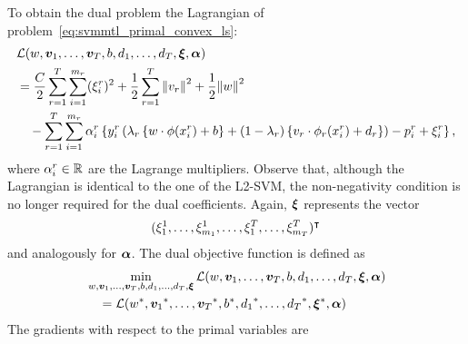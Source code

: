  To obtain the dual problem the Lagrangian of problem~\eqref{eq:svmmtl_primal_convex_ls}:
\begin{equation}\label{eq:svmmtl_lagrangian_convex_ls}
    \begin{aligned}
        & \lagr({w}, \fv{v}_1, \ldots, \fv{v}_\ntasks, b, d_1, \ldots, d_\ntasks, \fv{\xi}, \fv{\alpha}) \\
        &=  \frac{C}{2} \sum_{r= 1}^T \sum_{i=1}^{m_r} ({\xi_{i}^r})^2 + \frac{1}{2} \sum_{r= 1}^T{\norm{{v}_r}^2} + \frac{1}{2} {\norm{{w}}}^2 \\
        &\quad -  \sum_{r= 1}^T \sum_{i=1}^{m_r} \alpha_i^r \left\lbrace y_{i}^r  \left(\lambda_r \left\lbrace {w} \cdot \phi(x_{i}^r) + b  \right\rbrace + (1 - \lambda_r) \left\lbrace {v}_r \cdot \phi_r(x_{i}^r) + d_r \right\rbrace  \right) - p_{i}^r + \xi_{i}^r  \right\rbrace ,
    \end{aligned}
\end{equation}
where $\alpha_i^r \in \mathbb{R}$ are the Lagrange multipliers. Observe that, although the Lagrangian is identical to the one of the L2-SVM, the non-negativity condition is no longer required for the dual coefficients.  Again, $\bm{\xi}$ represents the vector $$(\xi_1^1, \ldots, \xi_{m_1}^1, \ldots, \xi_1^T, \ldots, \xi_{m_T}^T)^\intercal$$ and analogously for $\bm{\alpha}$. The dual objective function is defined as 
\begin{equation}\nonumber
    \begin{aligned}
          &  \min_{{w}, \bm{v}_1, \ldots, \bm{v}_T, b, d_1, \ldots, d_T, \bm{\xi}} \mathcal{L}({w}, \bm{v}_1, \ldots, \bm{v}_T, b, d_1, \ldots, d_T, \bm{\xi}, \bm{\alpha}) \\
         &\quad = \mathcal{L}({{w}}^*, {\bm{v}_1}^*, \ldots, {\bm{v}_T}^*, {b}^*, {d_1}^*, \ldots, {d_T}^*, {\bm{\xi}}^*, \bm{\alpha})
    \end{aligned}    
\end{equation}
The gradients with respect to the primal variables are
